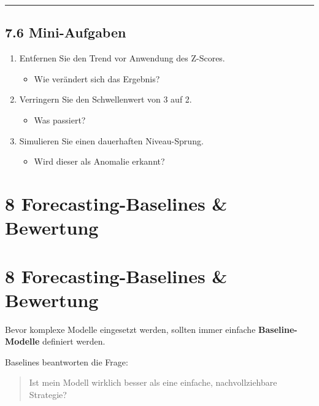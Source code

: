 \documentclass[
  ngerman,
  letterpaper,
  DIV=11]{scrreprt}
\providecommand{\tightlist}{%
  \setlength{\itemsep}{0pt}\setlength{\parskip}{0pt}}
\begin{document}
\begin{center}\rule{0.5\linewidth}{0.5pt}\end{center}

\section{7.6 Mini-Aufgaben}\label{mini-aufgaben-3}

\begin{enumerate}
\def\labelenumi{\arabic{enumi}.}
\tightlist
\item
  Entfernen Sie den Trend vor Anwendung des Z-Scores.

  \begin{itemize}
  \tightlist
  \item
    Wie verändert sich das Ergebnis?
  \end{itemize}
\item
  Verringern Sie den Schwellenwert von 3 auf 2.

  \begin{itemize}
  \tightlist
  \item
    Was passiert?
  \end{itemize}
\item
  Simulieren Sie einen dauerhaften Niveau-Sprung.

  \begin{itemize}
  \tightlist
  \item
    Wird dieser als Anomalie erkannt?
  \end{itemize}
\end{enumerate}


\chapter{8 Forecasting-Baselines \&
Bewertung}\label{forecasting-baselines-bewertung}


\chapter{8 Forecasting-Baselines \&
Bewertung}\label{forecasting-baselines-bewertung-1}

Bevor komplexe Modelle eingesetzt werden, sollten immer einfache
\textbf{Baseline-Modelle} definiert werden.

Baselines beantworten die Frage:

\begin{quote}
Ist mein Modell wirklich besser als eine einfache, nachvollziehbare
Strategie?
\end{quote}
\end{document}
